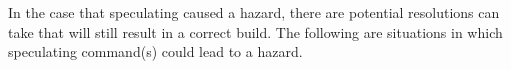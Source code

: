 







In the case that speculating caused a hazard, there are potential resolutions \Rattle can take that will still result in a correct build.  The following are situations in which \Rattle speculating command(s) could lead to a hazard.

